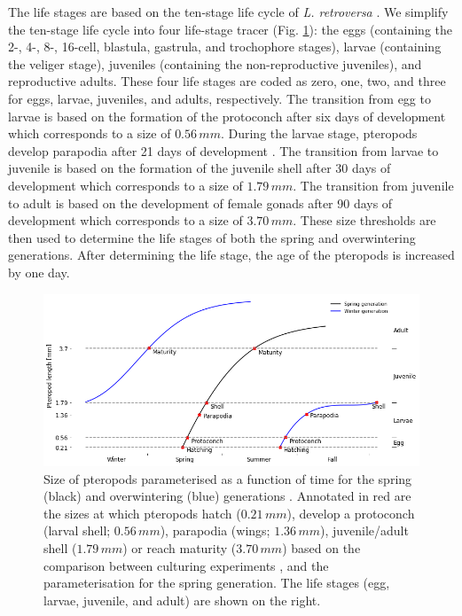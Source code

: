 The life stages are based on the ten-stage life cycle of \textit{L. retroversa} \citep{Howes2014Lab,Thabet2015Lifestages}. We simplify the ten-stage life cycle into four life-stage tracer (Fig. \ref{fig:optimal_growth}):  the eggs (containing the 2-, 4-, 8-, 16-cell, blastula, gastrula, and trochophore stages), larvae (containing the veliger stage), juveniles (containing the non-reproductive juveniles), and reproductive adults. These four life stages are coded as zero, one, two, and three for eggs, larvae, juveniles, and adults, respectively. The transition from egg to larvae is based on the formation of the protoconch after six days of development \citep{Thabet2015Lifestages} which corresponds to a size of $0.56 \, mm$. During the larvae stage, pteropods develop parapodia after 21 days of development \citep{Thabet2015Lifestages}. The transition from larvae to juvenile is based on the formation of the juvenile shell after 30 days of development \citep{Thabet2015Lifestages} which corresponds to a size of $1.79 \, mm$. The transition from juvenile to adult is based on the development of female gonads after 90 days of development \citep{Thabet2015Lifestages} which corresponds to a size of $3.70 \, mm$. These size thresholds are then used to determine the life stages of both the spring and overwintering generations. After determining the life stage, the age of the pteropods is increased by one day.

\begin{figure}[tbh!]
    \centering
    
        \includegraphics[width=\textwidth]{images/Growth_functions.png}
       
    
    \caption{Size of pteropods parameterised as a function of time for the spring (black) and overwintering (blue) generations \citep{Wang2017Lifecycle}. Annotated in red are the sizes at which pteropods hatch ($0.21 \, mm$), develop a protoconch (larval shell; $0.56 \, mm$), parapodia (wings; $1.36 \, mm$), juvenile/adult shell ($1.79 \, mm$) or reach maturity ($3.70 \, mm$) based on the comparison between culturing experiments \citep{Howes2014Lab,Thabet2015Lifestages}, and the parameterisation for the spring generation. The life stages (egg, larvae, juvenile, and adult) are shown on the right.}
    \label{fig:optimal_growth}
\end{figure}

